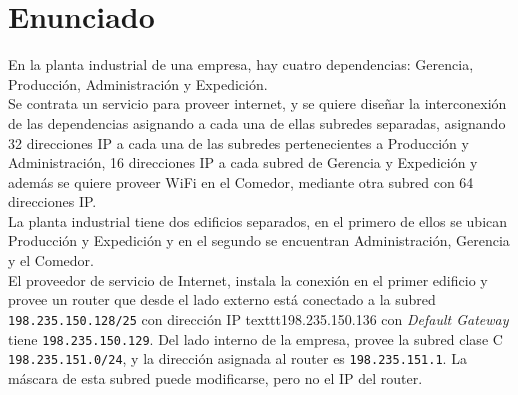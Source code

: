 \section{Enunciado}
En la planta industrial de una empresa, hay cuatro dependencias: Gerencia, Producción, Administración y Expedición.\\

Se contrata un servicio para proveer internet, y se quiere diseñar la interconexión de las dependencias asignando a cada una de ellas subredes separadas, asignando 32 direcciones IP a cada una de las subredes pertenecientes a Producción y Administración, 16 direcciones IP a cada subred de Gerencia y Expedición y además se quiere proveer WiFi en el Comedor, mediante otra subred con 64 direcciones IP.\\

La planta industrial tiene dos edificios separados, en el primero de ellos se ubican Producción y Expedición y en el segundo se encuentran Administración, Gerencia y el Comedor.\\

El proveedor de servicio de Internet, instala la conexión en el primer edificio y provee un router que desde el lado externo está conectado a la subred \texttt{198.235.150.128/25} con dirección IP texttt{198.235.150.136} con \textit{Default Gateway} tiene \texttt{198.235.150.129}. Del lado interno de la empresa, provee la subred clase C \texttt{198.235.151.0/24}, y la dirección asignada al router es \texttt{198.235.151.1}. La máscara de esta subred puede modificarse, pero no el IP del router.\\

